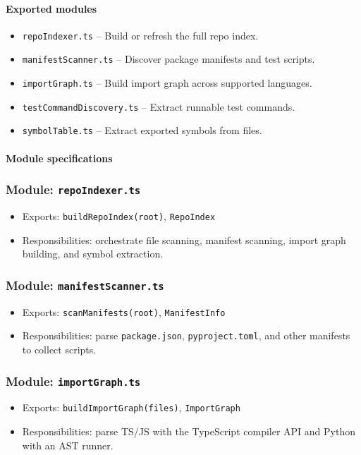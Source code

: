 \documentclass[11pt]{article}
\begin{document}
\paragraph{Exported modules}
\begin{itemize}[noitemsep]
  \item \texttt{repoIndexer.ts} -- Build or refresh the full repo index.
  \item \texttt{manifestScanner.ts} -- Discover package manifests and test scripts.
  \item \texttt{importGraph.ts} -- Build import graph across supported languages.
  \item \texttt{testCommandDiscovery.ts} -- Extract runnable test commands.
  \item \texttt{symbolTable.ts} -- Extract exported symbols from files.
\end{itemize}

\paragraph{Module specifications}
\subsubsection*{Module: \texttt{repoIndexer.ts}}
\begin{itemize}[noitemsep]
  \item Exports: \texttt{buildRepoIndex(root)}, \texttt{RepoIndex}
  \item Responsibilities: orchestrate file scanning, manifest scanning, import graph building, and symbol extraction.
\end{itemize}

\subsubsection*{Module: \texttt{manifestScanner.ts}}
\begin{itemize}[noitemsep]
  \item Exports: \texttt{scanManifests(root)}, \texttt{ManifestInfo}
  \item Responsibilities: parse \texttt{package.json}, \texttt{pyproject.toml}, and other manifests to collect scripts.
\end{itemize}

\subsubsection*{Module: \texttt{importGraph.ts}}
\begin{itemize}[noitemsep]
  \item Exports: \texttt{buildImportGraph(files)}, \texttt{ImportGraph}
  \item Responsibilities: parse TS/JS with the TypeScript compiler API and Python with an AST runner.
\end{itemize}
\end{document}
